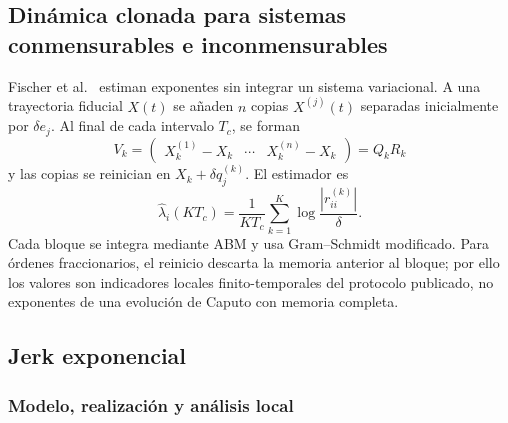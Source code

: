 \subsection{Dinámica clonada para sistemas conmensurables e inconmensurables}

Fischer et al.~\cite{fischer2020} estiman exponentes sin integrar un sistema
variacional. A una trayectoria fiducial \(X(t)\) se añaden \(n\) copias
\(X^{(j)}(t)\) separadas inicialmente por
\(\delta e_j\). Al final de cada intervalo \(T_c\), se forman
\begin{equation}
 V_k=\begin{pmatrix}
 X_k^{(1)}-X_k&\cdots&X_k^{(n)}-X_k
 \end{pmatrix}=Q_kR_k
\end{equation}
y las copias se reinician en \(X_k+\delta q_j^{(k)}\). El estimador es
\begin{equation}
 \widehat\lambda_i(KT_c)=\frac{1}{KT_c}
 \sum_{k=1}^{K}\log\frac{|r_{ii}^{(k)}|}{\delta}.
 \label{ncbench:eq:cloned}
\end{equation}
Cada bloque se integra mediante ABM y usa Gram--Schmidt modificado.
Para órdenes fraccionarios, el reinicio descarta la memoria anterior al bloque;
por ello los valores son indicadores locales finito-temporales del protocolo
publicado, no exponentes de una evolución de Caputo con memoria completa.

\subsection{Jerk exponencial}

\subsubsection*{Modelo, realización y análisis local}

